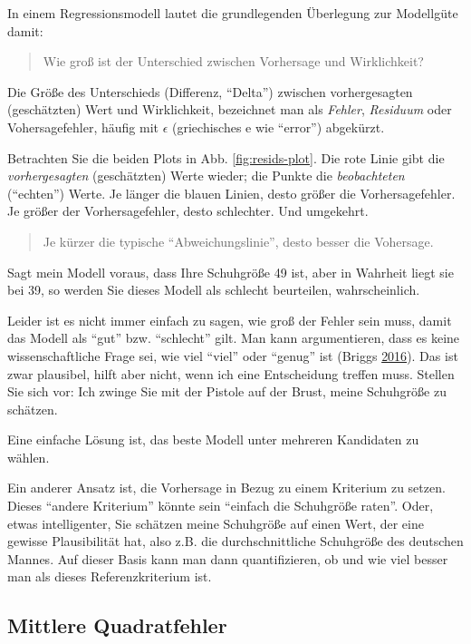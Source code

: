 \documentclass[12pt,ngerman,]{book}
\theoremstyle{definition}
\theoremstyle{definition}
\theoremstyle{remark}
\begin{document}
In einem Regressionsmodell lautet die grundlegenden Überlegung zur
Modellgüte damit:

\begin{quote}
Wie groß ist der Unterschied zwischen Vorhersage und Wirklichkeit?
\end{quote}

Die Größe des Unterschieds (Differenz, ``Delta'') zwischen
vorhergesagten (geschätzten) Wert und Wirklichkeit, bezeichnet man als
\emph{Fehler}, \emph{Residuum} oder Vohersagefehler, häufig mit
\(\epsilon\) (griechisches e wie ``error'') abgekürzt.

Betrachten Sie die beiden Plots in Abb. \ref{fig:resids-plot}. Die rote
Linie gibt die \emph{vorhergesagten} (geschätzten) Werte wieder; die
Punkte die \emph{beobachteten} (``echten'') Werte. Je länger die blauen
Linien, desto größer die Vorhersagefehler. Je größer der
Vorhersagefehler, desto schlechter. Und umgekehrt.

\begin{quote}
Je kürzer die typische ``Abweichungslinie'', desto besser die Vohersage.
\end{quote}

Sagt mein Modell voraus, dass Ihre Schuhgröße 49 ist, aber in Wahrheit
liegt sie bei 39, so werden Sie dieses Modell als schlecht beurteilen,
wahrscheinlich.

Leider ist es nicht immer einfach zu sagen, wie groß der Fehler sein
muss, damit das Modell als ``gut'' bzw. ``schlecht'' gilt. Man kann
argumentieren, dass es keine wissenschaftliche Frage sei, wie viel
``viel'' oder ``genug'' ist (Briggs
\protect\hyperlink{ref-uncertainty}{2016}). Das ist zwar plausibel,
hilft aber nicht, wenn ich eine Entscheidung treffen muss. Stellen Sie
sich vor: Ich zwinge Sie mit der Pistole auf der Brust, meine Schuhgröße
zu schätzen.

Eine einfache Lösung ist, das beste Modell unter mehreren Kandidaten zu
wählen.

Ein anderer Ansatz ist, die Vorhersage in Bezug zu einem Kriterium zu
setzen. Dieses ``andere Kriterium'' könnte sein ``einfach die Schuhgröße
raten''. Oder, etwas intelligenter, Sie schätzen meine Schuhgröße auf
einen Wert, der eine gewisse Plausibilität hat, also z.B. die
durchschnittliche Schuhgröße des deutschen Mannes. Auf dieser Basis kann
man dann quantifizieren, ob und wie viel besser man als dieses
Referenzkriterium ist.

\subsection{Mittlere Quadratfehler}\label{mittlere-quadratfehler}
\end{document}
